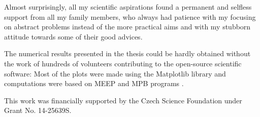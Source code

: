 Almost surprisingly, all my scientific aspirations found a permanent and selfless support from all my family members, who always had patience with my focusing on abstract problems instead of the more practical aims and with my stubborn attitude towards some of their good advices.

The numerical results presented in the thesis could be hardly obtained without the work of hundreds of volunteers contributing to the open-source scientific software: Most of the plots were made using the Matplotlib library \cite{hunter2007} and computations were based on MEEP \cite{oskooi2010meep} and MPB programs \cite{johnson2001mpb}. 

This work was financially supported by the Czech Science Foundation under Grant No. 14-25639S.

\thispagestyle{empty} \newpage ~ \thispagestyle{empty} \newpage \setcounter{page}{7}
